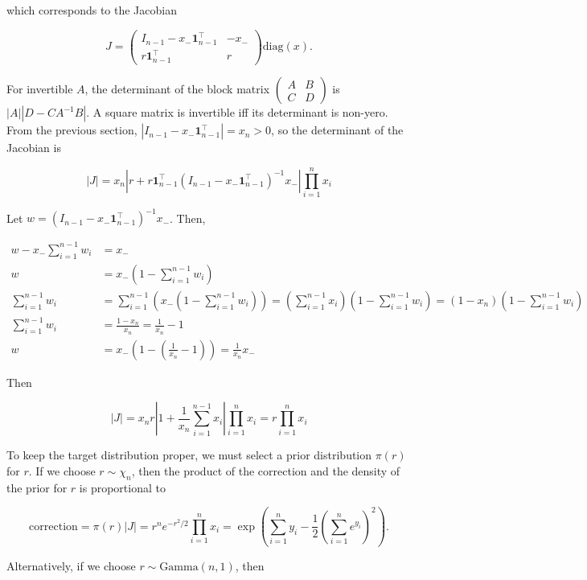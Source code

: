 \documentclass[twoside]{article}
\begin{document}
which corresponds to the Jacobian

$$J = \begin{pmatrix}I_{n-1} - x_- \boldsymbol{1}_{n-1}^\top & -x_- \\ r \boldsymbol{1}_{n-1}^\top & r \end{pmatrix} \mathrm{diag}(x).$$

For invertible $A$, the determinant of the block matrix $\begin{pmatrix}A & B \\ C & D\end{pmatrix}$ is $|A| |D-CA^{-1}B|$.
A square matrix is invertible iff its determinant is non-yero.
From the previous section, $|I_{n-1} - x_- \boldsymbol{1}_{n-1}^\top| = x_n > 0$, so the determinant of the Jacobian is

$$|J| = x_n \left|r + r \boldsymbol{1}_{n-1}^\top (I_{n-1} - x_- \boldsymbol{1}_{n-1}^\top)^{-1} x_-\right| \prod_{i=1}^n x_i$$

Let $w = (I_{n-1} - x_- \boldsymbol{1}_{n-1}^\top)^{-1} x_-$. Then,

$$
\begin{aligned}
    w - x_- \sum_{i=1}^{n-1} w_i &= x_-\\
    w &= x_- \left(1 - \sum_{i=1}^{n-1} w_i\right)\\
    \sum_{i=1}^{n-1} w_i &= \sum_{i=1}^{n-1} \left( x_- (1 - \sum_{i=1}^{n-1} w_i) \right) = \left(\sum_{i=1}^{n-1} x_i \right) \left(1 - \sum_{i=1}^{n-1} w_i\right) = (1 - x_n)  \left(1 - \sum_{i=1}^{n-1} w_i\right)\\
    \sum_{i=1}^{n-1} w_i &= \frac{1 - x_n}{x_n} = \frac{1}{x_n} - 1\\
    w &= x_- \left(1 - \left(\frac{1}{x_n} - 1\right)\right) = \frac{1}{x_n} x_-
\end{aligned}
$$

Then

$$|J| = x_n r \left|1 + \frac{1}{x_n}\sum_{i=1}^{n-1} x_i\right| \prod_{i=1}^n x_i = r \prod_{i=1}^n x_i$$

To keep the target distribution proper, we must select a prior distribution $\pi(r)$ for $r$.
If we choose $r \sim \chi_n$, then the product of the correction and the density of the prior for $r$ is proportional to

$$\mathrm{correction} = \pi(r) |J| = r^n e^{-r^2/2} \prod_{i=1}^n x_i = \exp\left(\sum_{i=1}^n y_i - \frac{1}{2}\left(\sum_{i=1}^n e^{y_i}\right)^2\right).$$

Alternatively, if we choose $r \sim \mathrm{Gamma}(n, 1)$, then
\end{document}
